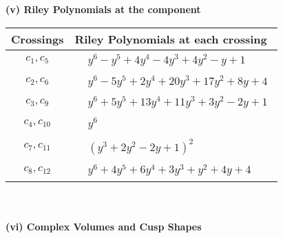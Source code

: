 \documentclass[1p]{elsarticle_modified}
\theoremstyle{definition}
\begin{document}
\newpage\renewcommand{\arraystretch}{1}
\flushleft \textbf{(v) Riley Polynomials at the component}\newline \\
\begin{tabular}{m{50pt}|m{274pt}}
Crossings & \hspace{64pt}Riley Polynomials at each crossing \\
\hline $$\begin{aligned}c_{1},c_{5}\end{aligned}$$&$\begin{aligned}
&y^6- y^5+4 y^4-4 y^3+4 y^2- y+1
\end{aligned}$\\
\hline $$\begin{aligned}c_{2},c_{6}\end{aligned}$$&$\begin{aligned}
&y^6-5 y^5+2 y^4+20 y^3+17 y^2+8 y+4
\end{aligned}$\\
\hline $$\begin{aligned}c_{3},c_{9}\end{aligned}$$&$\begin{aligned}
&y^6+5 y^5+13 y^4+11 y^3+3 y^2-2 y+1
\end{aligned}$\\
\hline $$\begin{aligned}c_{4},c_{10}\end{aligned}$$&$\begin{aligned}
&y^6
\end{aligned}$\\
\hline $$\begin{aligned}c_{7},c_{11}\end{aligned}$$&$\begin{aligned}
&(y^3+2 y^2-2 y+1)^2
\end{aligned}$\\
\hline $$\begin{aligned}c_{8},c_{12}\end{aligned}$$&$\begin{aligned}
&y^6+4 y^5+6 y^4+3 y^3+y^2+4 y+4
\end{aligned}$\\
\hline
\end{tabular}\\~\\
\newpage\flushleft \textbf{(vi) Complex Volumes and Cusp Shapes}
\end{document}
